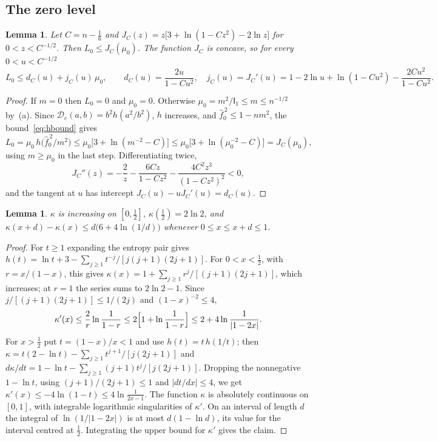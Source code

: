 \documentclass[11pt]{amsart}
\newtheorem{lemma}[theorem]{Lemma}
\theoremstyle{definition}
\theoremstyle{remark}
\newcommand{\I}{\mathsf I}
\newcommand{\wh}[1]{\widehat{#1}}
\begin{document}
\subsection{The zero level}
\begin{lemma}\label{lem:zero}
Let $C=n-\frac16$ and $J_C(z)=z\bigl[3+\ln(1-Cz^2)-2\ln z\bigr]$ for $0<z<C^{-1/2}$. Then $L_0\le J_C(\mu_0)$. The function $J_C$ is concave, so for every $0<u<C^{-1/2}$
\[
 L_0\le d_C(u)+j_C(u)\,\mu_0,\qquad d_C(u)=\frac{2u}{1-Cu^2},\quad j_C(u)=J_C'(u)=1-2\ln u+\ln(1-Cu^2)-\frac{2Cu^2}{1-Cu^2}.
\]
\end{lemma}

\begin{proof}
If $m=0$ then $L_0=0$ and $\mu_0=0$. Otherwise $\mu_0=m^2/\I_1\le m\le n^{-1/2}$ by~(a). Since $\mathcal D_e(a,b)=b^2h(a^2/b^2)$, $h$ increases, and $\wh f_0^{\,2}\le1-nm^2$, the bound~\eqref{eq:hbound} gives
\[
 L_0=\mu_0\,h\bigl(\wh f_0^{\,2}/m^2\bigr)\le\mu_0\bigl[3+\ln(m^{-2}-C)\bigr]\le\mu_0\bigl[3+\ln(\mu_0^{-2}-C)\bigr]=J_C(\mu_0),
\]
using $m\ge\mu_0$ in the last step. Differentiating twice,
\[
 J_C''(z)=-\frac2z-\frac{6Cz}{1-Cz^2}-\frac{4C^2z^3}{(1-Cz^2)^2}<0,
\]
and the tangent at $u$ has intercept $J_C(u)-uJ_C'(u)=d_C(u)$.
\end{proof}

\begin{lemma}\label{lem:shift}
$\kappa$ is increasing on $[0,\frac12]$, $\kappa(\frac12)=2\ln2$, and $\kappa(x+d)-\kappa(x)\le d\bigl(6+4\ln(1/d)\bigr)$ whenever $0\le x\le x+d\le1$.
\end{lemma}

\begin{proof}
For $t\ge1$ expanding the entropy pair gives $h(t)=\ln t+3-\sum_{j\ge1}t^{-j}/[j(j+1)(2j+1)]$. For $0<x<\frac12$, with $r=x/(1-x)$, this gives $\kappa(x)=1+\sum_{j\ge1}r^j/[(j+1)(2j+1)]$, which increases; at $r=1$ the series sums to $2\ln2-1$. Since $j/[(j+1)(2j+1)]\le1/(2j)$ and $(1-x)^{-2}\le4$,
\[
 \kappa'(x)\le\frac{2}{r}\ln\frac1{1-r}\le2\Bigl[1+\ln\frac1{1-r}\Bigr]\le2+4\ln\frac1{|1-2x|}.
\]
For $x>\frac12$ put $t=(1-x)/x<1$ and use $h(t)=t\,h(1/t)$; then $\kappa=t(2-\ln t)-\sum_{j\ge1}t^{j+1}/[j(2j+1)]$ and $d\kappa/dt=1-\ln t-\sum_{j\ge1}(j+1)t^j/[j(2j+1)]$. Dropping the nonnegative $1-\ln t$, using $(j+1)/(2j+1)\le1$ and $|dt/dx|\le4$, we get $\kappa'(x)\le-4\ln(1-t)\le4\ln\frac1{2x-1}$. The function $\kappa$ is absolutely continuous on $[0,1]$, with integrable logarithmic singularities of $\kappa'$. On an interval of length $d$ the integral of $\ln(1/|1-2x|)$ is at most $d(1-\ln d)$, its value for the interval centred at $\frac12$. Integrating the upper bound for $\kappa'$ gives the claim.
\end{proof}
\end{document}
